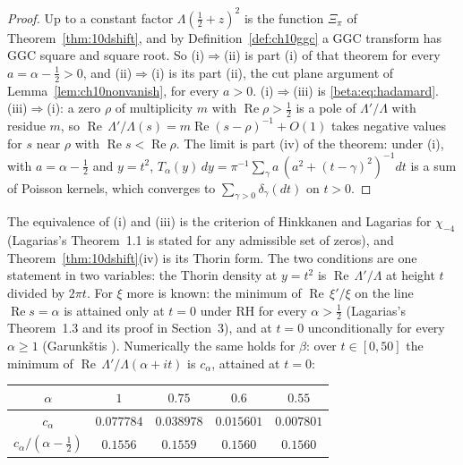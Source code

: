 \begin{proof}
Up to a constant factor $\Lambda(\tfrac12+z)^2$ is the function $\Xi_\pi$ of Theorem~\ref{thm:10dshift}, and by Definition~\ref{def:ch10ggc} a GGC transform has GGC square and square root. So (i)$\Rightarrow$(ii) is part (i) of that theorem for every $a=\alpha-\frac12>0$, and (ii)$\Rightarrow$(i) is its part (ii), the cut plane argument of Lemma~\ref{lem:ch10nonvanish}, for every $a>0$. (i)$\Rightarrow$(iii) is \eqref{beta:eq:hadamard}. (iii)$\Rightarrow$(i): a zero $\rho$ of multiplicity $m$ with $\operatorname{Re}\rho>\tfrac12$ is a pole of $\Lambda'/\Lambda$ with residue $m$, so $\operatorname{Re}\,\Lambda'/\Lambda(s)=m\operatorname{Re}(s-\rho)^{-1}+O(1)$ takes negative values for $s$ near $\rho$ with $\operatorname{Re} s<\operatorname{Re}\rho$. The limit is part (iv) of the theorem: under (i), with $a=\alpha-\tfrac12$ and $y=t^2$, $T_\alpha(y)\,dy=\pi^{-1}\sum_\gamma a\,(a^2+(t-\gamma)^2)^{-1}dt$ is a sum of Poisson kernels, which converges to $\sum_{\gamma>0}\delta_\gamma(dt)$ on $t>0$.
\end{proof}

The equivalence of (i) and (iii) is the criterion of Hinkkanen \cite{hinkkanen1997} and Lagarias \cite{lagarias1999} for $\chi_{-4}$ (Lagarias's Theorem~1.1 is stated for any admissible set of zeros), and Theorem~\ref{thm:10dshift}(iv) is its Thorin form. The two conditions are one statement in two variables: the Thorin density at $y=t^2$ is $\operatorname{Re}\,\Lambda'/\Lambda$ at height $t$ divided by $2\pi t$. For $\xi$ more is known: the minimum of $\operatorname{Re}\,\xi'/\xi$ on the line $\operatorname{Re}s=\alpha$ is attained only at $t=0$ under RH for every $\alpha>\frac12$ (Lagarias's Theorem~1.3 and its proof in Section~3), and at $t=0$ unconditionally for every $\alpha\ge1$ (Garunk\v{s}tis \cite{garunkstis2002}). Numerically the same holds for $\beta$: over $t\in[0,50]$ the minimum of $\operatorname{Re}\,\Lambda'/\Lambda(\alpha+it)$ is $c_\alpha$, attained at $t=0$:

\begin{center}
\begin{tabular}{ccccc}
\toprule
$\alpha$ & $1$ & $0.75$ & $0.6$ & $0.55$\\
\midrule
$c_\alpha$ & $0.077784$ & $0.038978$ & $0.015601$ & $0.007801$\\
$c_\alpha/(\alpha-\frac12)$ & $0.1556$ & $0.1559$ & $0.1560$ & $0.1560$\\
\bottomrule
\end{tabular}
\end{center}

